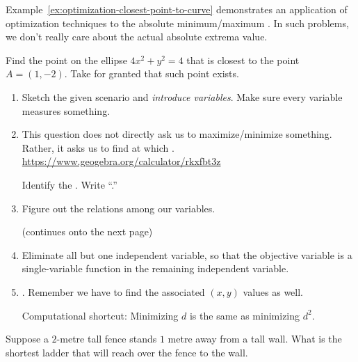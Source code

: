\documentclass[../main.tex]{subfiles}
\begin{document}
  \medskip
  Example~\ref{ex:optimization-closest-point-to-curve} demonstrates an application of optimization techniques to  the absolute minimum/maximum . In such problems, we don't really care about the actual absolute extrema value. 

  \begin{example} \label{ex:optimization-closest-point-to-curve}
    Find the point on the ellipse \(4x^{2} + y^{2} = 4\) that is closest to the point \(A = (1,-2)\). Take for granted that such point exists.

    \begin{enumerate}
      \item Sketch the given scenario and \emph{introduce variables}. Make sure every variable measures something. 

      \item This question does not directly ask us to maximize/minimize something. Rather, it asks us to find \underline{\hspace{1in}} at which \underline{\hspace{2in}}. \url{https://www.geogebra.org/calculator/rkxfbt3z}

        Identify the . Write ``\emph{}.''

      \item Figure out the relations among our variables. 

        \vfill{}{\footnotesize (continues onto the next page)} \clearpage

      \item Eliminate all but one independent variable, so that the objective variable is a single-variable function in the remaining independent variable. 

      \item {}. Remember we have to find the associated \((x,y)\) values as well. 

        Computational shortcut: Minimizing \(d\) is the same as minimizing \(d^{2}\).
    \end{enumerate}
  \end{example}
  \clearpage

  \clearpage

  \begin{example} \label{ex:optimization-ladder}
    Suppose a \(2\)-metre tall fence stands \(1\) metre away from a tall wall.  What is the shortest ladder that will reach over the fence to the wall.
  \end{example}
\end{document}
